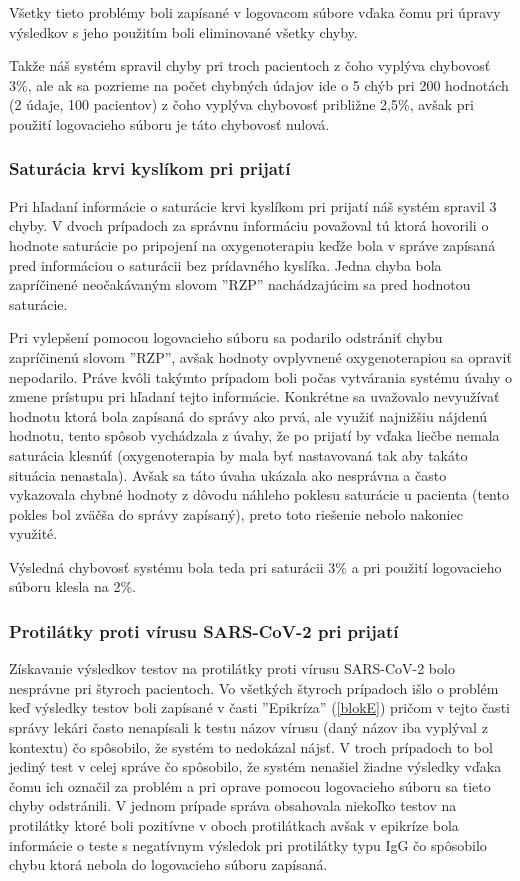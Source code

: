Všetky tieto problémy boli zapísané v logovacom súbore vďaka čomu pri úpravy výsledkov s jeho použitím boli eliminované všetky chyby.

Takže náš systém spravil chyby pri troch pacientoch z čoho vyplýva chybovosť 3\%, ale ak sa pozrieme na počet chybných údajov ide o 5 chýb pri 200 hodnotách (2 údaje, 100 pacientov) z čoho vyplýva chybovosť približne 2,5\%, avšak pri použití logovacieho súboru je táto chybovosť nulová.     

\subsubsection{Saturácia krvi kyslíkom pri prijatí}

Pri hľadaní informácie o saturácie krvi kyslíkom pri prijatí náš systém spravil 3 chyby. V dvoch prípadoch za správnu informáciu považoval tú ktorá hovorili o hodnote saturácie po pripojení na oxygenoterapiu keďže bola v správe zapísaná pred informáciou o saturácii bez prídavného kyslíka. Jedna chyba bola zapríčinené neočakávaným slovom ''RZP'' nachádzajúcim sa pred hodnotou saturácie.

Pri vylepšení pomocou logovacieho súboru sa podarilo odstrániť chybu zapríčinenú slovom ''RZP'', avšak hodnoty ovplyvnené oxygenoterapiou sa opraviť nepodarilo. Práve kvôli takýmto prípadom boli počas vytvárania systému úvahy o zmene prístupu pri hľadaní tejto informácie. Konkrétne sa uvažovalo nevyužívať hodnotu ktorá bola zapísaná do správy ako prvá, ale využiť najnižšiu nájdenú hodnotu, tento spôsob vychádzala z úvahy, že po prijatí by vďaka liečbe nemala saturácia klesnúť (oxygenoterapia by mala byť nastavovaná tak aby takáto situácia nenastala). Avšak sa táto úvaha ukázala ako nesprávna a často vykazovala chybné hodnoty z dôvodu náhleho poklesu saturácie u pacienta (tento pokles bol zväčša do správy zapísaný), preto toto riešenie nebolo nakoniec využité.

Výsledná chybovosť systému bola teda pri saturácii 3\% a pri použití logovacieho súboru klesla na 2\%.

\subsubsection{Protilátky proti vírusu SARS-CoV-2 pri prijatí}

Získavanie výsledkov testov na protilátky proti vírusu SARS-CoV-2 bolo nesprávne pri štyroch pacientoch. Vo všetkých štyroch prípadoch išlo o problém keď výsledky testov boli zapísané v časti ''Epikríza'' (\ref{blokE}) pričom v tejto časti správy lekári často nenapísali k testu názov vírusu (daný názov iba vyplýval z kontextu) čo spôsobilo, že systém to nedokázal nájsť. V troch prípadoch to bol jediný test v celej správe čo spôsobilo, že systém nenašiel žiadne výsledky vďaka čomu ich označil za problém a pri oprave pomocou logovacieho súboru sa tieto chyby odstránili. V jednom prípade správa obsahovala niekoľko testov na protilátky ktoré boli pozitívne v oboch protilátkach avšak v epikríze bola informácie o teste s negatívnym výsledok pri protilátky typu IgG čo spôsobilo chybu ktorá nebola do logovacieho súboru zapísaná.

